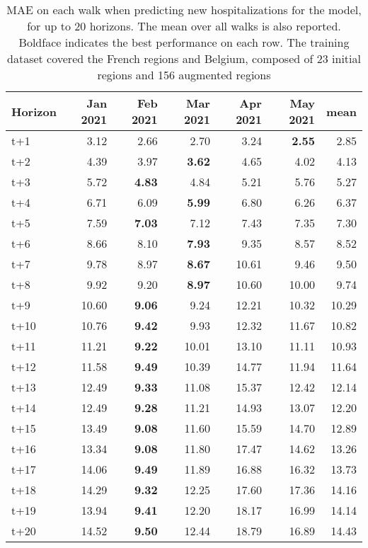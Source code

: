 \begin{table}[H]
\centering
\caption{MAE on each walk when predicting new hospitalizations for the model, for up to 20 horizons. The mean over all walks is also reported. Boldface indicates the best performance on each row. The training dataset covered the French regions and Belgium, composed of 23 initial regions and 156 augmented regions }
\label{tab:MAE_walk_dense_model}
\begin{tabular}{lrrrrrr}
\toprule
Horizon &  Jan 2021 &  Feb 2021 &  Mar 2021 &  Apr 2021 &  May 2021 &  mean \\
\midrule
t+1  & 3.12  & 2.66  & 2.70  & 3.24  & \textbf{2.55}  & 2.85  \\
t+2  & 4.39  & 3.97  & \textbf{3.62}  & 4.65  & 4.02  & 4.13  \\
t+3  & 5.72  & \textbf{4.83}  & 4.84  & 5.21  & 5.76  & 5.27  \\
t+4  & 6.71  & 6.09  & \textbf{5.99}  & 6.80  & 6.26  & 6.37  \\
t+5  & 7.59  & \textbf{7.03}  & 7.12  & 7.43  & 7.35  & 7.30  \\
t+6  & 8.66  & 8.10  & \textbf{7.93}  & 9.35  & 8.57  & 8.52  \\
t+7  & 9.78  & 8.97  & \textbf{8.67}  & 10.61  & 9.46  & 9.50  \\
t+8  & 9.92  & 9.20  & \textbf{8.97}  & 10.60  & 10.00  & 9.74  \\
t+9  & 10.60  & \textbf{9.06}  & 9.24  & 12.21  & 10.32  & 10.29  \\
t+10  & 10.76  & \textbf{9.42}  & 9.93  & 12.32  & 11.67  & 10.82  \\
t+11  & 11.21  & \textbf{9.22}  & 10.01  & 13.10  & 11.11  & 10.93  \\
t+12  & 11.58  & \textbf{9.49}  & 10.39  & 14.77  & 11.94  & 11.64  \\
t+13  & 12.49  & \textbf{9.33}  & 11.08  & 15.37  & 12.42  & 12.14  \\
t+14  & 12.49  & \textbf{9.28}  & 11.21  & 14.93  & 13.07  & 12.20  \\
t+15  & 13.49  & \textbf{9.08}  & 11.60  & 15.59  & 14.70  & 12.89  \\
t+16  & 13.34  & \textbf{9.08}  & 11.80  & 17.47  & 14.62  & 13.26  \\
t+17  & 14.06  & \textbf{9.49}  & 11.89  & 16.88  & 16.32  & 13.73  \\
t+18  & 14.29  & \textbf{9.32}  & 12.25  & 17.60  & 17.36  & 14.16  \\
t+19  & 13.94  & \textbf{9.41}  & 12.20  & 18.17  & 16.99  & 14.14  \\
t+20  & 14.52  & \textbf{9.50}  & 12.44  & 18.79  & 16.89  & 14.43  \\

\bottomrule
\end{tabular}
\end{table}
